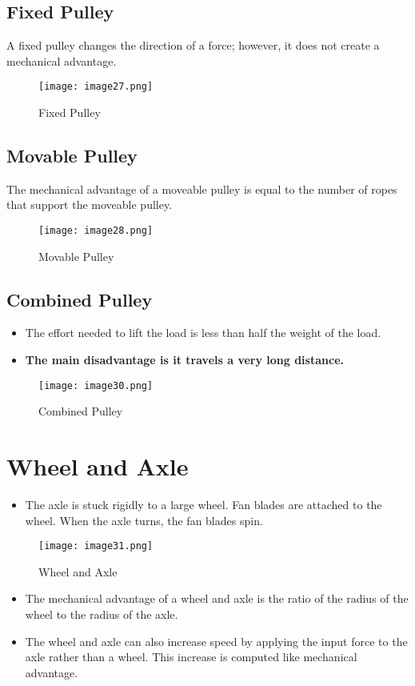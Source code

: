 \documentclass[12pt]{scrartcl}
\begin{document}
\subsection{Fixed Pulley}
A fixed pulley changes the direction of a force; however, it does not create a mechanical advantage. 
\begin{figure}[htp]
    \centering
    \texttt{[image: image27.png]}
    \caption{Fixed Pulley}
\end{figure}
\subsection{Movable Pulley}
The mechanical advantage of a moveable pulley is equal to the number of ropes that support the moveable pulley. 
\begin{figure}[H]
    \centering
    \texttt{[image: image28.png]}
    \caption{Movable Pulley}
\end{figure}
\subsection{Combined Pulley}
\begin{itemize}
    \item The effort needed to lift the load is less than half the weight of the load.
    \item \textbf{The main disadvantage is it travels a very long distance.}
\end{itemize}
\begin{figure}[H]
    \centering
    \texttt{[image: image30.png]}
    \caption{Combined Pulley}
\end{figure}
\section{Wheel and Axle}
\begin{itemize}
    \item The axle is stuck rigidly to a large wheel. Fan blades are attached to the wheel. When the axle turns, the fan blades spin. 
\end{itemize}
\begin{figure}[H]
    \centering
    \texttt{[image: image31.png]}
    \caption{Wheel and Axle}
\end{figure}
\begin{itemize}
    \item The mechanical advantage of a wheel and axle is the ratio of the radius of the wheel to the radius of the axle.
    \item The wheel and axle can also increase speed by applying the input force to the axle rather than a wheel. This increase is computed like mechanical advantage.
\end{itemize}
\end{document}
